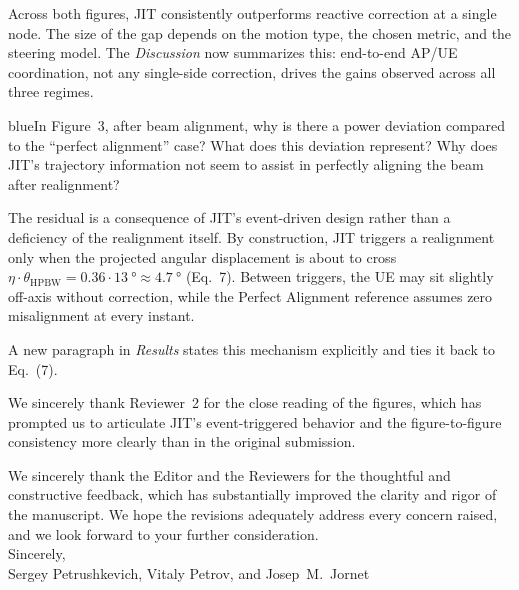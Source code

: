 \documentclass{article}
\newcommand{\blue}[1]{\begin{color}{blue}#1\end{color}}
\begin{document}
\noindent Across both figures, JIT consistently outperforms reactive correction at a single node. The size of the gap depends on the motion type, the chosen metric, and the steering model. The \emph{Discussion} now summarizes this: end-to-end AP/UE coordination, not any single-side correction, drives the gains observed across all three regimes.

\begin{tcbremark}
{\selectfont
\blue{In Figure~3, after beam alignment, why is there a power deviation compared to the ``perfect alignment'' case? What does this deviation represent? Why does JIT's trajectory information not seem to assist in perfectly aligning the beam after realignment?}
}
\end{tcbremark}

\noindent The residual is a consequence of JIT's event-driven design rather than a deficiency of the realignment itself. By construction, JIT triggers a realignment only when the projected angular displacement is about to cross $\eta \cdot \theta_{\text{HPBW}} = 0.36 \cdot \SI{13}{\degree} \approx \SI{4.7}{\degree}$ (Eq.~7). Between triggers, the UE may sit slightly off-axis without correction, while the Perfect Alignment reference assumes zero misalignment at every instant.

\medskip
\noindent A new paragraph in \emph{Results} states this mechanism explicitly and ties it back to Eq.~(7).

\bigskip
\noindent We sincerely thank Reviewer~2 for the close reading of the figures, which has prompted us to articulate JIT's event-triggered behavior and the figure-to-figure consistency more clearly than in the original submission.

\newpage

\noindent We sincerely thank the Editor and the Reviewers for the thoughtful and constructive feedback, which has substantially improved the clarity and rigor of the manuscript. We hope the revisions adequately address every concern raised, and we look forward to your further consideration.\\

\noindent Sincerely,\\

\noindent Sergey Petrushkevich, Vitaly Petrov, and Josep~M.~Jornet

\printbibliography
\end{document}
